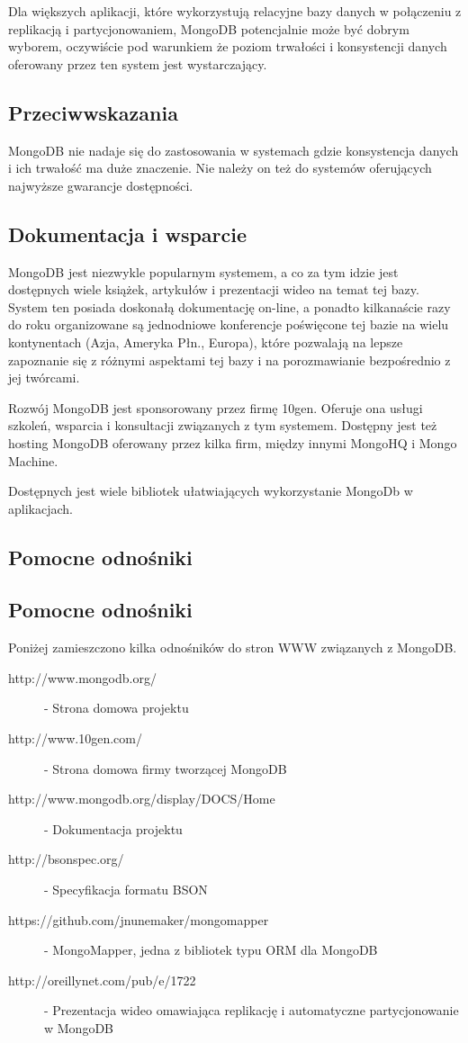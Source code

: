 Dla większych aplikacji, które wykorzystują relacyjne bazy danych w połączeniu z replikacją i partycjonowaniem, MongoDB potencjalnie może być dobrym wyborem, oczywiście pod warunkiem że poziom trwałości i konsystencji danych oferowany przez ten system jest wystarczający.

\subsection*{Przeciwwskazania}

MongoDB nie nadaje się do zastosowania w systemach gdzie konsystencja danych i ich trwałość ma duże znaczenie.
Nie należy on też do systemów oferujących najwyższe gwarancje dostępności.

\subsection*{Dokumentacja i wsparcie}

MongoDB jest niezwykle popularnym systemem, a co za tym idzie jest dostępnych wiele książek, artykułów i prezentacji wideo na temat tej bazy.
System ten posiada doskonałą dokumentację on-line, a ponadto kilkanaście razy do roku organizowane są jednodniowe konferencje poświęcone tej bazie na wielu kontynentach (Azja, Ameryka Płn., Europa), które pozwalają na lepsze zapoznanie się z różnymi aspektami tej bazy i na porozmawianie bezpośrednio z jej twórcami.

Rozwój MongoDB jest sponsorowany przez firmę 10gen.
Oferuje ona usługi szkoleń, wsparcia i konsultacji związanych z tym systemem.
Dostępny jest też hosting MongoDB oferowany przez kilka firm, między innymi MongoHQ i Mongo Machine.

Dostępnych jest wiele bibliotek ułatwiających wykorzystanie MongoDb w aplikacjach.

\subsection*{Pomocne odnośniki}

\subsection*{Pomocne odnośniki}

Poniżej zamieszczono kilka odnośników do stron WWW związanych z MongoDB.

\begin{description}
 \item [http://www.mongodb.org/] - Strona domowa projektu
 \item [http://www.10gen.com/] - Strona domowa firmy tworzącej MongoDB
 \item [http://www.mongodb.org/display/DOCS/Home] - Dokumentacja projektu 
 \item [http://bsonspec.org/] - Specyfikacja formatu BSON
 \item [https://github.com/jnunemaker/mongomapper] - MongoMapper, jedna z bibliotek typu ORM dla MongoDB
 \item [http://oreillynet.com/pub/e/1722] - Prezentacja wideo omawiająca replikację i automatyczne partycjonowanie w MongoDB
\end{description}
